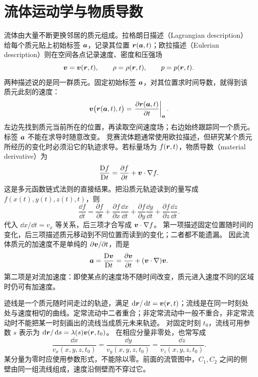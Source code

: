 \section{流体运动学与物质导数}\label{ch13:sec:material}

流体由大量不断更换邻居的质元组成。拉格朗日描述（Lagrangian description）给每个质元贴上初始标签 $\bm{a}$，记录其位置 $\bm{r}(\bm{a},t)$；欧拉描述（Eulerian description）则在空间各点记录速度、密度和压强场
\begin{equation}
 \bm{v}=\bm{v}(\bm{r},t),\qquad \rho=\rho(\bm{r},t),\qquad p=p(\bm{r},t).
\end{equation}
两种描述说的是同一群质元。固定初始标签 $\bm{a}$，对其位置求时间导数，就得到该质元此刻的速度：
\[
 \bm{v}\bigl(\bm{r}(\bm{a},t),t\bigr)
 =\left.\frac{\partial\bm{r}(\bm{a},t)}{\partial t}\right|_{\bm{a}}.
\]
左边先找到质元当前所在的位置，再读取空间速度场；右边始终跟踪同一个质元。标签 $\bm{a}$ 不能在求导时随意改变。
竞赛流体题通常使用欧拉描述，但研究某个质元所经历的变化时必须沿它的轨迹求导。若标量场为 $f(\bm{r},t)$，物质导数（material derivative）为
\begin{equation}
 \frac{\mathrm D f}{\mathrm Dt}
 =\frac{\partial f}{\partial t}+\bm{v}\cdot\nabla f.
\end{equation}
这是多元函数链式法则的直接结果。把沿质元轨迹读到的量写成
$f(x(t),y(t),z(t),t)$，则
\[
 \frac{\dd f}{\dd t}=\frac{\partial f}{\partial t}
 +\frac{\partial f}{\partial x}\frac{\dd x}{\dd t}
 +\frac{\partial f}{\partial y}\frac{\dd y}{\dd t}
 +\frac{\partial f}{\partial z}\frac{\dd z}{\dd t}.
\]
代入 $\dd x/\dd t=v_x$ 等关系，后三项才合写成 $\bm{v}\cdot\nabla f$。
第一项描述固定位置随时间的变化，后三项描述质元移动到不同位置而读到的变化；二者都不能遗漏。
因此流体质元的加速度不是单纯的 $\partial\bm{v}/\partial t$，而是
\begin{equation}
 \bm{a}=\frac{\mathrm D\bm{v}}{\mathrm Dt}
 =\frac{\partial\bm{v}}{\partial t}+(\bm{v}\cdot\nabla)\bm{v}.
\end{equation}
第二项是对流加速度：即使某点的速度场不随时间改变，质元进入速度不同的区域时仍可有加速度。

迹线是一个质元随时间走过的轨迹，满足 $\mathop{}\!\mathrm d\bm{r}/\mathop{}\!\mathrm d t=\bm{v}(\bm{r},t)$；流线是在同一时刻处处与速度相切的曲线。定常流动中二者重合；非定常流动中一般不重合，非定常流动时不能把某一时刻画出的流线当成质元未来轨迹。
对固定时刻 $t_0$，流线可用参数 $s$ 表示为 $\mathop{}\!\mathrm d\bm{r}/\mathop{}\!\mathrm d s=\lambda(s)\bm{v}(\bm{r},t_0)$。
在相应分量非零处，也常写成
\[
 \frac{\dd x}{v_x(x,y,z,t_0)}=\frac{\dd y}{v_y(x,y,z,t_0)}
 =\frac{\dd z}{v_z(x,y,z,t_0)}.
\]
某分量为零时应使用参数形式，不能除以零。前面的流管图中，$C_1,C_2$ 之间的侧壁由同一组流线组成，速度沿侧壁而不穿过它。

